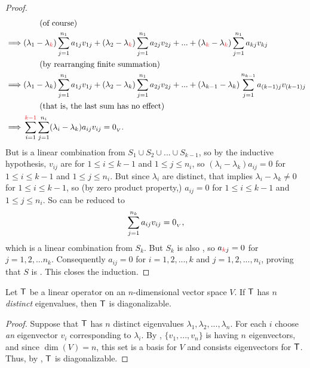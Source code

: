 \begin{proof}
\begin{align*}
             & \quad \quad \text{(of course)} \\
    \implies & (\lambda_1 - \lambda_{\RED{k}}) \sum_{j = 1}^{n_1} a_{1j} v_{1j} + (\lambda_2 - \lambda_{\RED{k}}) \sum_{j = 1}^{n_1} a_{2j} v_{2j} + ... + (\lambda_{\RED{k}} - \lambda_{\RED{k}}) \sum_{j = 1}^{n_1} a_{kj} v_{kj} \\
            & \quad \quad \text{(by rearranging finite summation)} \\
    \implies & (\lambda_1 - \lambda_k) \sum_{j = 1}^{n_1} a_{1j} v_{1j} + (\lambda_2 - \lambda_k) \sum_{j = 1}^{n_1} a_{2j} v_{2j} + ... + (\lambda_{k - 1} - \lambda_k) \sum_{j = 1}^{n_{k - 1}} a_{(k - 1)j} v_{(k - 1)j} \\
             & \quad \quad \text{(that is, the last sum has no effect)} \\
    \implies & \sum_{i = 1}^{\RED{k - 1}} \sum_{j = 1}^{n_i} (\lambda_i - \lambda_k) a_{ij} v_{ij} = \OV.
\end{align*}
But  is a linear combination from \(S_1 \cup S_2 \cup ... \cup S_{k - 1}\), so by the inductive hypothesis, \(v_{ij}\) are \LID{} for \(1 \le i \le k - 1\) and \(1 \le j \le n_i\), so \((\lambda_i - \lambda_k) a_{ij} = 0\) for \(1 \le i \le k - 1\) and \(1 \le j \le n_i\).
But since \(\lambda_i\) are distinct, that implies \(\lambda_i - \lambda_k \ne 0\) for \(1 \le i \le k - 1\), so (by zero product property,) \(a_{ij} = 0\) for \(1 \le i \le k - 1\) and \(1 \le j \le n_i\).
So  can be reduced to
\[
    \sum_{j = 1}^{n_k} a_{ij} v_{ij} = 0_{_V},
\]
which is a linear combination from \(S_k\).
But \(S_k\) is also \LID{}, so \(a_{\RED{k}j} = 0\) for \(j = 1, 2, ... n_k\).
Consequently \(a_{ij} = 0\) for \(i = 1, 2, ..., k\) and \(j = 1, 2, ..., n_i\), proving that \(S\) is \LID{}.
This closes the induction.
\end{proof}

\begin{corollary} \label{corollary 5.5.1}
Let \(\textsf{T}\) be a linear operator on an \(n\)-dimensional vector space \(V\).
If \(\textsf{T}\) has \(n\) \emph{distinct} eigenvalues, then \(\textsf{T}\) is diagonalizable.
\end{corollary}

\begin{proof}
Suppose that \(\textsf{T}\) has \(n\) distinct eigenvalues \(\lambda_1, \lambda_2, ..., \lambda_n\).
For each \(i\) choose \emph{an} eigenvector \(v_i\) corresponding to \(\lambda_i\).
By , \(\{v_1, ..., v_n \}\) is \LID{} having \(n\) eigenvectors, and since \(\dim(V) = n\), this set is a basis for \(V\) and consists eigenvectors for \(\textsf{T}\).
Thus, by , \(\textsf{T}\) is diagonalizable.
\end{proof}


